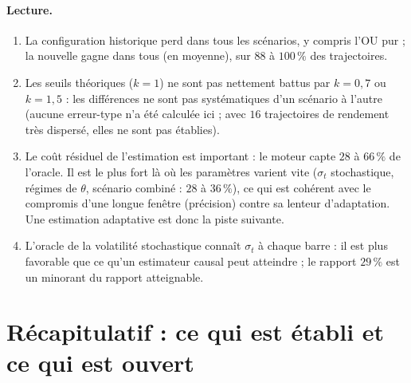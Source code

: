 \documentclass[11pt,a4paper]{article}
\theoremstyle{definition}
\theoremstyle{remark}
\begin{document}
\paragraph{Lecture.}
\begin{enumerate}[nosep]
\item La configuration historique perd dans tous les scénarios, y compris l'OU pur ; la nouvelle gagne dans tous (en moyenne), sur $88$ à $100\,\%$ des trajectoires.
\item Les seuils théoriques ($k=1$) ne sont pas nettement battus par $k=0{,}7$ ou $k=1{,}5$ : les différences ne sont pas systématiques d'un scénario à l'autre (aucune erreur-type n'a été calculée ici ; avec $16$ trajectoires de rendement très dispersé, elles ne sont pas établies).
\item Le coût résiduel de l'estimation est important : le moteur capte $28$ à $66\,\%$ de l'oracle. Il est le plus fort là où les paramètres varient vite ($\sigma_t$ stochastique, régimes de $\theta$, scénario combiné : $28$ à $36\,\%$),
ce qui est cohérent avec le compromis d'une longue fenêtre (précision) contre sa lenteur d'adaptation. Une estimation adaptative est donc la piste suivante.
\item L'oracle de la volatilité stochastique connaît $\sigma_t$ à chaque barre : il est plus favorable que ce qu'un estimateur causal peut atteindre ; le rapport $29\,\%$ est un minorant du rapport atteignable.
\end{enumerate}

\section{Récapitulatif : ce qui est établi et ce qui est ouvert}
\end{document}
